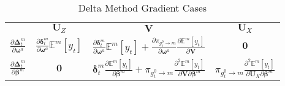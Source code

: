 \documentclass[12pt]{article}
\newcommand{\gateprod}[2]{\pi_{#1 \longrightarrow #2}}
\newcommand{\Eym}{\mathbb{E}^{m} \left[ y_{t} \right]}
\theoremstyle{definition}
\begin{document}
 \bigskip

\begin{table}
  \begin{center}
    \begin{tabular}{| l | c c c |}
    \hline
                                                                                    & \underline{$\boldsymbol{U}_{Z}$}                                                            & \underline{$\boldsymbol{V}$}                                                                                                                                                                                           & \underline{$\boldsymbol{U}_{X}$}   \\ [2ex]
    $\frac{\partial \boldsymbol{\Delta}_{t}^{m}}{\partial \boldsymbol{\omega}^{a}}$ & $\frac{\partial \boldsymbol{\delta}^{m}_{t}}{\partial \boldsymbol{\omega}^{a}} \Eym$        & $\frac{\partial \boldsymbol{\delta}^{m}_{t}}{\partial \boldsymbol{\omega}^{a}} \Eym + \frac{\partial \gateprod{g^{0}_{t}}{m}}{\partial \boldsymbol{\omega}^{a}}  \frac{\partial \Eym}{{\partial \boldsymbol{V}}}$  & $\boldsymbol{0}$                   \\ [2ex]
    $\frac{\partial \boldsymbol{\Delta}_{t}^{m}}{\partial \boldsymbol{\beta}^{m}}$  & $\boldsymbol{0}$                                                                            & $\boldsymbol{\delta}^{m}_{t} \frac{\partial \Eym}{\partial \boldsymbol{\beta}^{m}} + \gateprod{g^{0}_{t}}{m}   \frac{\partial^{2} \Eym}{\partial \boldsymbol{V} \partial \boldsymbol{\beta}^{m}}$    & $\gateprod{g^{0}_{t}}{m}  \frac{\partial^{2} \Eym}{\partial \boldsymbol{U}_{X} \partial \boldsymbol{\beta}^{m}}$  \\ [1ex]
    \hline
    \end{tabular}
  \caption{\label{tbl:delta_method_gradients} Delta Method Gradient Cases}
  \end{center}
\end{table}
\end{document}
